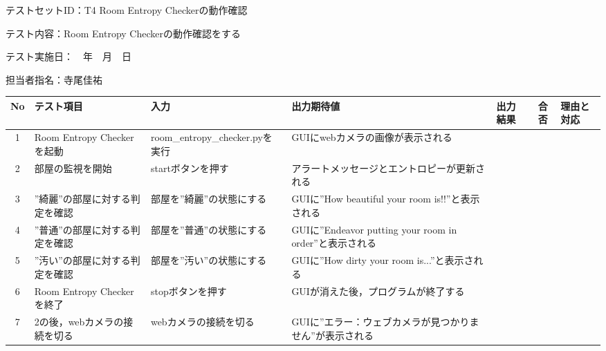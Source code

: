 テストセットID：T4 Room Entropy Checkerの動作確認

テスト内容：Room Entropy Checkerの動作確認をする

テスト実施日：　年　月　日

担当者指名：寺尾佳祐


\begin{table}[H]
    \centering
    \begin{tabular}{|c|p{11em}|p{11em}|p{7em}|p{6em}|c|p{5em}|} \hline
        No & テスト項目 & 入力 & 出力期待値 & 出力結果 & 合否 & 理由と対応 \\ \hline
        1 & Room Entropy Checkerを起動 & room\_entropy\_checker.pyを実行 & GUIにwebカメラの画像が表示される &  &  & \\ \hline
        2 & 部屋の監視を開始 & startボタンを押す & アラートメッセージとエントロピーが更新される &  &  & \\ \hline
        3 & ”綺麗”の部屋に対する判定を確認 & 部屋を”綺麗”の状態にする & GUIに”How beautiful your room is!!”と表示される &  &  & \\ \hline
        4 & ”普通”の部屋に対する判定を確認 & 部屋を”普通”の状態にする & GUIに”Endeavor putting your room in order”と表示される &  &  & \\ \hline
        5 & ”汚い”の部屋に対する判定を確認 & 部屋を”汚い”の状態にする & GUIに”How dirty your room is...”と表示される &  &  & \\ \hline
        6 & Room Entropy Checkerを終了 & stopボタンを押す & GUIが消えた後，プログラムが終了する &  &  & \\ \hline
        7 & 2の後，webカメラの接続を切る & webカメラの接続を切る & GUIに”エラー：ウェブカメラが見つかりません”が表示される &  &  & \\ \hline
    \end{tabular}
    \label{tab:test_set1}
\end{table}